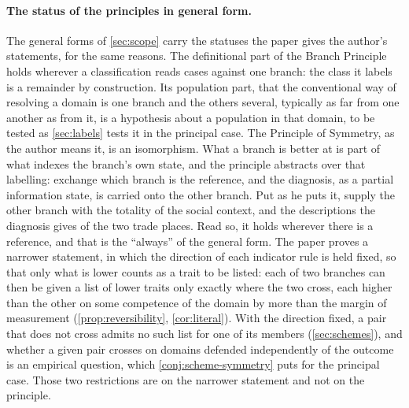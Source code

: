 \paragraph{The status of the principles in general form.} The general forms of \autoref{sec:scope} carry the statuses the paper gives the author's statements, for the same reasons. The definitional part of the Branch Principle holds wherever a classification reads cases against one branch: the class it labels is a remainder by construction. Its population part, that the conventional way of resolving a domain is one branch and the others several, typically as far from one another as from it, is a hypothesis about a population in that domain, to be tested as \autoref{sec:labels} tests it in the principal case. The Principle of Symmetry, as the author means it, is an isomorphism. What a branch is better at is part of what indexes the branch's own state, and the principle abstracts over that labelling: exchange which branch is the reference, and the diagnosis, as a partial information state, is carried onto the other branch. Put as he puts it, supply the other branch with the totality of the social context, and the descriptions the diagnosis gives of the two trade places. Read so, it holds wherever there is a reference, and that is the ``always'' of the general form. The paper proves a narrower statement, in which the direction of each indicator rule is held fixed, so that only what is lower counts as a trait to be listed: each of two branches can then be given a list of lower traits only exactly where the two cross, each higher than the other on some competence of the domain by more than the margin of measurement (\autoref{prop:reversibility}, \autoref{cor:literal}). With the direction fixed, a pair that does not cross admits no such list for one of its members (\autoref{sec:schemes}), and whether a given pair crosses on domains defended independently of the outcome is an empirical question, which \autoref{conj:scheme-symmetry} puts for the principal case. Those two restrictions are on the narrower statement and not on the principle.
